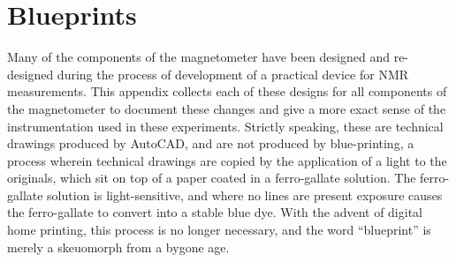 \documentclass[../PaulGanssle-Thesis.tex]{subfiles}
\begin{document}
\chapter{Blueprints}
\label{blueprints}
Many of the components of the magnetometer have been designed and re-designed during the process of development of a practical device for NMR measurements. This appendix collects each of these designs for all components of the magnetometer to document these changes and give a more exact sense of the instrumentation used in these experiments. Strictly speaking, these are technical drawings produced by AutoCAD, and are not produced by blue-printing, a process wherein technical drawings are copied by the application of a light to the originals, which sit on top of a paper coated in a ferro-gallate solution. The ferro-gallate solution is light-sensitive, and where no lines are present exposure causes the ferro-gallate to convert into a stable blue dye. With the advent of digital home printing, this process is no longer necessary, and the word ``blueprint'' is merely a skeuomorph from a bygone age.
\end{document}
